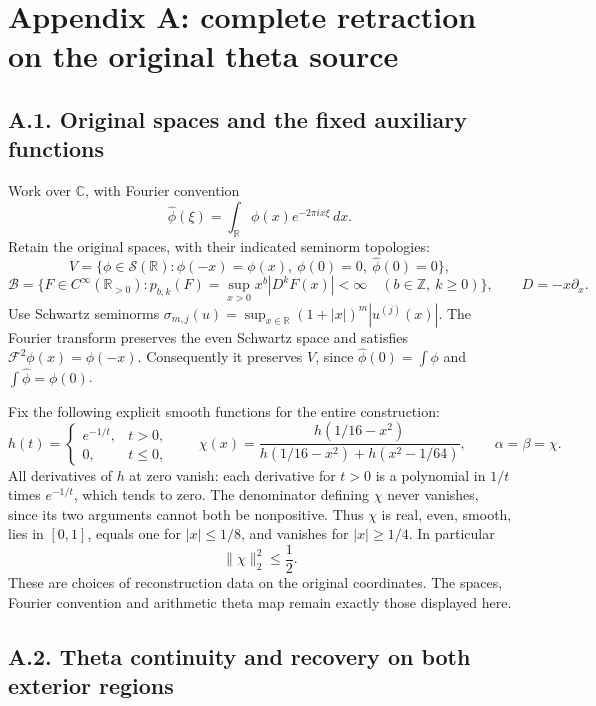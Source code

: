 \documentclass[
  11pt,
]{article}
\begin{document}
\section{Appendix A: complete retraction on the original theta
source}\label{appendix-a-complete-retraction-on-the-original-theta-source}

\subsection{A.1. Original spaces and the fixed auxiliary
functions}\label{a.1.-original-spaces-and-the-fixed-auxiliary-functions}

Work over \(\mathbb C\), with Fourier convention \[
\widehat\phi(\xi)=\int_{\mathbb R}\phi(x)e^{-2\pi ix\xi}\,dx.
\] Retain the original spaces, with their indicated seminorm topologies:
\[
V=\{\phi\in\mathcal S(\mathbb R):\phi(-x)=\phi(x),\
\phi(0)=0,\ \widehat\phi(0)=0\},
\] \[
\mathscr B=\{F\in C^\infty(\mathbb R_{>0}):
p_{b,k}(F)=\sup_{x>0}x^b|D^kF(x)|<\infty
\quad(b\in\mathbb Z,\ k\ge0)\},\qquad D=-x\partial_x.
\] Use Schwartz seminorms
\(\sigma_{m,j}(u)=\sup_{x\in\mathbb R}(1+|x|)^m|u^{(j)}(x)|\). The
Fourier transform preserves the even Schwartz space and satisfies
\(\mathcal F^2\phi(x)=\phi(-x)\). Consequently it preserves \(V\), since
\(\widehat\phi(0)=\int\phi\) and \(\int\widehat\phi=\phi(0)\).

Fix the following explicit smooth functions for the entire construction:
\[
h(t)=
\begin{cases}
e^{-1/t},&t>0,\\
0,&t\le0,
\end{cases}
\qquad
\chi(x)=
\frac{h(1/16-x^2)}
{h(1/16-x^2)+h(x^2-1/64)},\qquad \alpha=\beta=\chi.
\] All derivatives of \(h\) at zero vanish: each derivative for \(t>0\)
is a polynomial in \(1/t\) times \(e^{-1/t}\), which tends to zero. The
denominator defining \(\chi\) never vanishes, since its two arguments
cannot both be nonpositive. Thus \(\chi\) is real, even, smooth, lies in
\([0,1]\), equals one for \(|x|\le1/8\), and vanishes for \(|x|\ge1/4\).
In particular \[
\|\chi\|_2^2\le\frac12.
\] These are choices of reconstruction data on the original coordinates.
The spaces, Fourier convention and arithmetic theta map remain exactly
those displayed here.

\subsection{A.2. Theta continuity and recovery on both exterior
regions}\label{a.2.-theta-continuity-and-recovery-on-both-exterior-regions}
\end{document}
